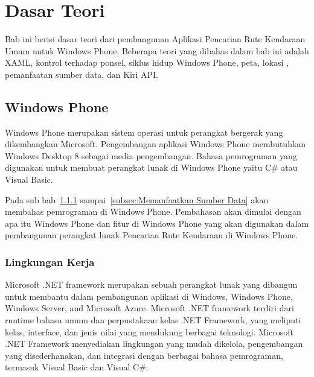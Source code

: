 \chapter{Dasar Teori}
\label{chap:teori}
Bab ini berisi dasar teori dari pembangunan Aplikasi Pencarian Rute Kendaraan Umum untuk Windows Phone. Beberapa teori yang dibahas dalam bab ini  adalah XAML, kontrol terhadap ponsel, siklus hidup Windows Phone, peta, lokasi , pemanfaatan sumber data, dan Kiri API. 

\section{Windows Phone}
\label{sec:Windows Phone}
\hspace{0.5cm} Windows Phone merupakan sistem operasi untuk perangkat bergerak yang dikembangkan Microsoft. Pengembangan aplikasi Windows Phone membutuhkan Windows Desktop 8 sebagai media pengembangan. Bahasa pemrograman yang digunakan untuk membuat perangkat lunak di Windows Phone yaitu C\# atau Visual Basic\cite{Manning}.  

Pada sub bab~\ref{subsec:Lingkungan Kerja} sampai~\ref{subsec:Memanfaatkan Sumber Data} akan membahas pemrograman di Windows Phone. Pembahasan akan dimulai dengan apa itu Windows Phone dan fitur di Windows Phone yang akan digunakan dalam pembangunan perangkat lunak Pencarian Rute Kendaraan di Windows Phone. 

\subsection{Lingkungan Kerja}
\label{subsec:Lingkungan Kerja}
\hspace{0.5cm} Microsoft .NET framework merupakan sebuah perangkat lunak yang dibangun untuk membantu dalam pembangunan aplikasi di Windows, Windows Phone, Windows Server, and Microsoft Azure\cite{MSDN}. Microsoft .NET framework terdiri dari runtime bahasa umum dan perpustakaan kelas .NET Framework, yang meliputi kelas, interface, dan jenis nilai yang mendukung berbagai teknologi. Microsoft .NET Framework menyediakan lingkungan yang mudah dikelola, pengembangan yang disederhanakan, dan integrasi dengan berbagai bahasa pemrograman, termasuk Visual Basic dan Visual C\#.

